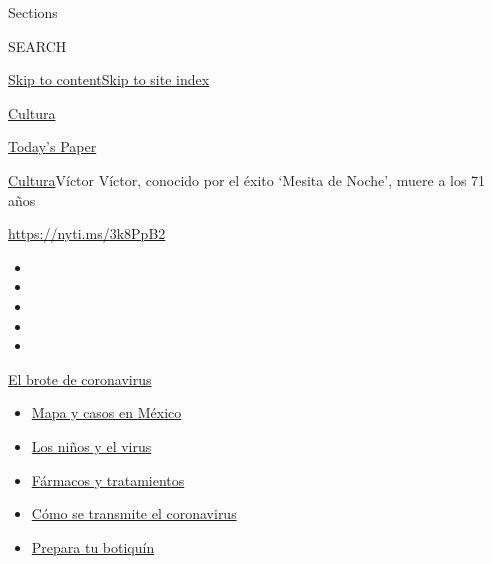 Sections

SEARCH

\protect\hyperlink{site-content}{Skip to
content}\protect\hyperlink{site-index}{Skip to site index}

\href{https://www.nytimes3xbfgragh.onion/es/section/cultura}{Cultura}

\href{https://myaccount.nytimes3xbfgragh.onion/auth/login?response_type=cookie\&client_id=vi}{}

\href{https://www.nytimes3xbfgragh.onion/section/todayspaper}{Today's
Paper}

\href{/es/section/cultura}{Cultura}\textbar{}Víctor Víctor, conocido por
el éxito `Mesita de Noche', muere a los 71 años

\url{https://nyti.ms/3k8PpB2}

\begin{itemize}
\item
\item
\item
\item
\item
\end{itemize}

\href{https://www.nytimes3xbfgragh.onion/es/spotlight/coronavirus?action=click\&pgtype=Article\&state=default\&region=TOP_BANNER\&context=storylines_menu}{El
brote de coronavirus}

\begin{itemize}
\tightlist
\item
  \href{https://www.nytimes3xbfgragh.onion/es/interactive/2020/espanol/america-latina/coronavirus-en-mexico.html?action=click\&pgtype=Article\&state=default\&region=TOP_BANNER\&context=storylines_menu}{Mapa
  y casos en México}
\item
  \href{https://www.nytimes3xbfgragh.onion/es/2020/07/31/espanol/ciencia-y-tecnologia/ninos-contagio-coronavirus.html?action=click\&pgtype=Article\&state=default\&region=TOP_BANNER\&context=storylines_menu}{Los
  niños y el virus}
\item
  \href{https://www.nytimes3xbfgragh.onion/es/interactive/2020/science/coronavirus-tratamientos-curas.html?action=click\&pgtype=Article\&state=default\&region=TOP_BANNER\&context=storylines_menu}{Fármacos
  y tratamientos}
\item
  \href{https://www.nytimes3xbfgragh.onion/es/2020/07/06/espanol/ciencia-y-tecnologia/coronavirus-transmision-aire.html?action=click\&pgtype=Article\&state=default\&region=TOP_BANNER\&context=storylines_menu}{Cómo
  se transmite el coronavirus}
\item
  \href{https://www.nytimes3xbfgragh.onion/es/2020/07/14/espanol/estilos-de-vida/botiquin-medicina-coronavirus.html?action=click\&pgtype=Article\&state=default\&region=TOP_BANNER\&context=storylines_menu}{Prepara
  tu botiquín}
\end{itemize}

